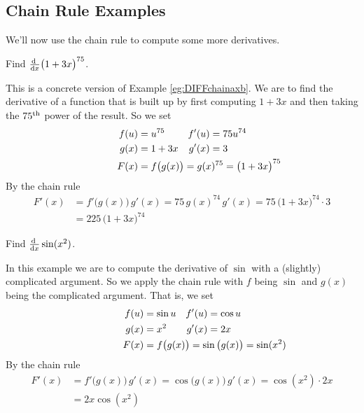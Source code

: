 \subsection*{Chain Rule Examples}

We'll now use the chain rule to compute some more derivatives.

\begin{eg}\label{eg:DIFFchainA}
Find $\diff{}{x}\big(1+3x\big)^{75}$.

This is a concrete version of Example \ref{eg:DIFFchainaxb}.
We are to find the derivative of a function that is built up by first
computing $1+3x$ and then taking the $75^{\rm th}$ power of the result.
So we set
\begin{align*}
f(u)&=u^{75} &
f'(u)&=75 u^{74} \\
g(x)&=1+3x &
g'(x)&=3 \\
F(x)&=f\big(g(x)\big)=g(x)^{75}=\big(1+3x\big)^{75}\hidewidth
\end{align*}
By the chain rule
\begin{align*}
F'(x)&= f'\big(g(x)\big)\,g'(x)
     = 75\, g(x)^{74} \,g'(x)
     = 75\, \big(1+3x\big)^{74} \cdot 3 \\
     &= 225\, \big(1+3x\big)^{74}
\end{align*}
\end{eg}

\begin{eg}\label{eg:DIFFchainB}
Find $\diff{}{x}\sin(x^2)$.

In this example we are to compute the derivative of $\sin$ with a
(slightly) complicated argument. So we apply the chain rule with $f$
being $\sin$ and $g(x)$ being the complicated argument. That is, we set
\begin{align*}
f(u)&=\sin u &
f'(u)&=\cos u \\
g(x)&=x^2 &
g'(x)&=2x \\
F(x)&=f\big(g(x)\big)=\sin\big(g(x)\big)=\sin(x^2)\hidewidth
\end{align*}
By the chain rule
\begin{align*}
F'(x)&= f'\big(g(x)\big)\,g'(x)
     = \cos\big(g(x)\big) \,g'(x)
     = \cos(x^2) \cdot 2x \\
     &= 2x\cos(x^2)
\end{align*}
\end{eg}

